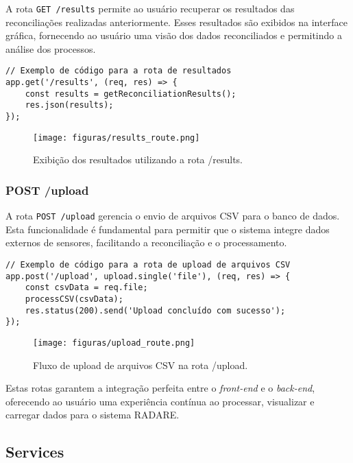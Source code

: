 A rota \texttt{GET /results} permite ao usuário recuperar os resultados das reconciliações realizadas anteriormente. Esses resultados são exibidos na interface gráfica, fornecendo ao usuário uma visão dos dados reconciliados e permitindo a análise dos processos.

\begin{verbatim}
// Exemplo de código para a rota de resultados
app.get('/results', (req, res) => {
    const results = getReconciliationResults();
    res.json(results);
});
\end{verbatim}

\begin{figure}[htbp]
    \centering
    \texttt{[image: figuras/results\_route.png]}
    \caption{Exibição dos resultados utilizando a rota /results.}
    \label{Fig:ResultsRoute}
\end{figure}

\subsubsection{POST /upload}

A rota \texttt{POST /upload} gerencia o envio de arquivos CSV para o banco de dados. Esta funcionalidade é fundamental para permitir que o sistema integre dados externos de sensores, facilitando a reconciliação e o processamento.

\begin{verbatim}
// Exemplo de código para a rota de upload de arquivos CSV
app.post('/upload', upload.single('file'), (req, res) => {
    const csvData = req.file;
    processCSV(csvData);
    res.status(200).send('Upload concluído com sucesso');
});
\end{verbatim}

\begin{figure}[htbp]
    \centering
    \texttt{[image: figuras/upload\_route.png]}
    \caption{Fluxo de upload de arquivos CSV na rota /upload.}
    \label{Fig:UploadRoute}
\end{figure}

Estas rotas garantem a integração perfeita entre o \textit{front-end} e o \textit{back-end}, oferecendo ao usuário uma experiência contínua ao processar, visualizar e carregar dados para o sistema RADARE.

\subsection{Services}

